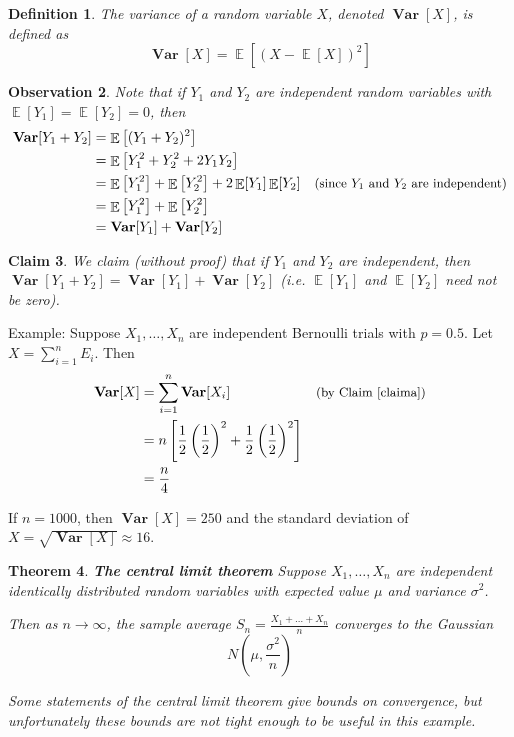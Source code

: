 \documentclass[11pt]{article}
\DeclareMathOperator*{\E}{\mathbb{E}}
\DeclareMathOperator*{\var}{\mathbf{Var}}
\newtheorem{theorem}{Theorem}
\newtheorem{observation}[theorem]{Observation}
\newtheorem{definition}[theorem]{Definition}
\newtheorem{claim}[theorem]{Claim}
\begin{document}
\begin{definition}
  The variance of a random variable $X$, denoted $\var[X]$, is defined as
  $$ \var[X] = \E\left[(X - \E[X])^2\right] $$
\end{definition}

\begin{observation}
Note that if $Y_1$ and $Y_2$ are independent random variables with $\E[Y_1] = \E[Y_2] = 0$, then
\begin{align*}
  \var[Y_1 + Y_2] &= \E\left[(Y_1 + Y_2)^2\right] \\
                  &= \E\left[Y_1^2 + Y_2^2 + 2Y_1Y_2\right] \\
                  &= \E\left[Y_1^2\right] + \E\left[Y_2^2\right] + 2\E[Y_1]\E[Y_2] &\small\text{(since $Y_1$ and $Y_2$ are independent)}\\
                  &= \E\left[Y_1^2\right] + \E\left[Y_2^2\right] \\
                  &= \var[Y_1] + \var[Y_2]
\end{align*}
\end{observation}

\begin{claim}\label{claima}
We claim (without proof) that if $Y_1$ and $Y_2$ are independent, then $\var[Y_1 + Y_2] = \var[Y_1] + \var[Y_2]$ (i.e. $\E[Y_1]$ and $\E[Y_2]$ need not be zero).
\end{claim}

Example: Suppose $X_1,\dots,X_n$ are independent Bernoulli trials with $p=0.5$. Let $X = \sum_{i=1}^n E_i$. Then
\begin{align*}
  \var[X] &= \sum_{i=1}^n \var[X_i] &\small\text{(by Claim \ref{claima})}\\
          &= n\left[ \frac12 \left(\frac12\right)^2 + \frac12 \left(\frac12\right)^2 \right] \\
          &= \frac{n}{4}
\end{align*}

If $n=1000$, then $\var[X] = 250$ and the standard deviation of $X = \sqrt{\var[X]} \approx 16$.

\begin{theorem}
  \textbf{The central limit theorem}
  Suppose $X_1,\dots,X_n$ are independent identically distributed random variables with expected value $\mu$ and variance $\sigma^2$.

  Then as $n \to \infty$, the sample average $S_n = \frac{X_1 + \dots + X_n}{n}$ converges to the Gaussian
  $$ N\left(\mu, \frac{\sigma^2}{n}\right) $$

  Some statements of the central limit theorem give bounds on convergence, but unfortunately these bounds are not tight enough to be useful in this example.
\end{theorem}
\end{document}
